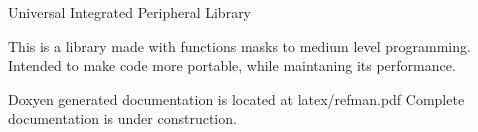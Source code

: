 Universal Integrated Peripheral Library

This is a library made with functions masks to medium level programming. Intended to make code more portable, while maintaning its performance.

Doxyen generated documentation is located at latex/refman.\-pdf Complete documentation is under construction. 